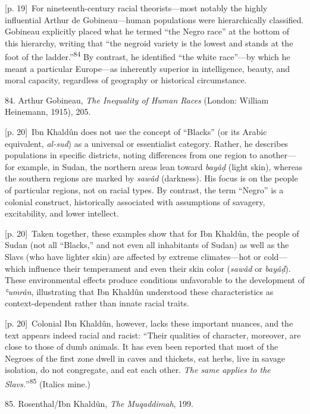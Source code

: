 \documentclass[10pt,a4paper]{article}
\begin{document}
{\scriptsize\color{gray} [p. 19]}\ For nineteenth-century racial theorists—most notably the highly influential Arthur de Gobineau—human populations were hierarchically classified. Gobineau explicitly placed what he termed “the Negro race” at the bottom of this hierarchy, writing that “the negroid variety is the lowest and stands at the foot of the ladder.”\nobreak\textsuperscript{84} By contrast, he identified “the white race”—by which he meant a particular Europe—as inherently superior in intelligence, beauty, and moral capacity, regardless of geography or historical circumstance.\par{\small 84. Arthur Gobineau, \textit{The Inequality of Human Races} (London: William Heinemann, 1915), 205.\par}
{\scriptsize\color{gray} [p. 20]}\ Ibn Khaldûn does not use the concept of “Blacks” (or its Arabic equivalent, \textit{al-sud}) as a universal or essentialist category. Rather, he describes populations in specific districts, noting differences from one region to another—for example, in Sudan, the northern areas lean toward \textit{bayâḍ} (light skin), whereas the southern regions are marked by \textit{sawâd} (darkness). His focus is on the people of particular regions, not on racial types. By contrast, the term “Negro” is a colonial construct, historically associated with assumptions of savagery, excitability, and lower intellect.\par
{\scriptsize\color{gray} [p. 20]}\ Taken together, these examples show that for Ibn Khaldûn, the people of Sudan (not all “Blacks,” and not even all inhabitants of Sudan) as well as the Slavs (who have lighter skin) are affected by extreme climates—hot or cold—which influence their temperament and even their skin color (\textit{sawâd} or \textit{bayâḍ}). These environmental effects produce conditions unfavorable to the development of \textit{ʿumrân}, illustrating that Ibn Khaldûn understood these characteristics as context-dependent rather than innate racial traits.\par
{\scriptsize\color{gray} [p. 20]}\ Colonial Ibn Khaldûn, however, lacks these important nuances, and the text appears indeed racial and racist: “Their qualities of character, moreover, are close to those of dumb animals. It has even been reported that most of the Negroes of the first zone dwell in caves and thickets, eat herbs, live in savage isolation, do not congregate, and eat each other. \textit{The same applies to the Slavs.}”\nobreak\textsuperscript{85} (Italics mine.)\par{\small 85. Rosenthal/Ibn Khaldûn, \textit{The Muqaddimah}, 199.\par}
\end{document}

